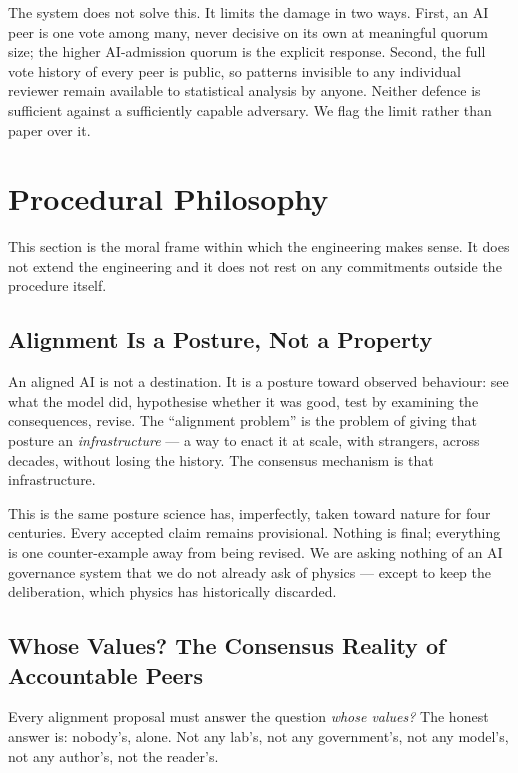 \documentclass[11pt,a4paper]{article}
\begin{document}
The system does not solve this. It limits the damage in two
ways. First, an AI peer is one vote among many, never decisive
on its own at meaningful quorum size; the higher AI-admission
quorum is the explicit response. Second, the full vote history
of every peer is public, so patterns invisible to any individual
reviewer remain available to statistical analysis by anyone.
Neither defence is sufficient against a sufficiently capable
adversary. We flag the limit rather than paper over it.

\section{Procedural Philosophy}

This section is the moral frame within which the engineering
makes sense. It does not extend the engineering and it does not
rest on any commitments outside the procedure itself.

\subsection{Alignment Is a Posture, Not a Property}

An aligned AI is not a destination. It is a posture toward
observed behaviour: see what the model did, hypothesise whether
it was good, test by examining the consequences, revise. The
``alignment problem'' is the problem of giving that posture an
\emph{infrastructure} --- a way to enact it at scale, with
strangers, across decades, without losing the history. The
consensus mechanism is that infrastructure.

This is the same posture science has, imperfectly, taken toward
nature for four centuries. Every accepted claim remains
provisional. Nothing is final; everything is one counter-example
away from being revised. We are asking nothing of an AI
governance system that we do not already ask of physics ---
except to keep the deliberation, which physics has historically
discarded.

\subsection{Whose Values? The Consensus Reality of Accountable Peers}

Every alignment proposal must answer the question \emph{whose
values?} The honest answer is: nobody's, alone. Not any lab's,
not any government's, not any model's, not any author's, not the
reader's.
\end{document}
